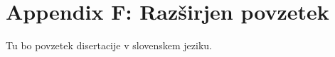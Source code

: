 \chapter*{\vspace{-2.3cm} \Large Appendix F: Raz{\v s}irjen povzetek \vspace{1.7cm}}

\fancyhead[LO]{}

Tu bo povzetek disertacije v slovenskem jeziku.
